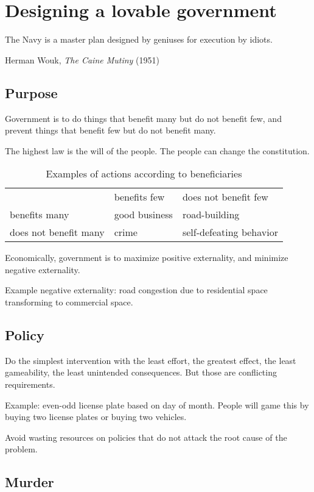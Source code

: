 \chapter{Designing a lovable government}

\epigraph{The Navy is a master plan designed by geniuses for execution by idiots.}{Herman Wouk, \emph{The Caine Mutiny} (1951)}

\section{Purpose}

Government is to do things that benefit many but do not benefit few,
and prevent things that benefit few but do not benefit many.

The highest law is the will of the people.
The people can change the constitution.

\begin{table}[h]
    \caption{Examples of actions according to beneficiaries}
    \begin{tabular}{lll}
        & benefits few & does not benefit few
        \\
        benefits many & good business & road-building
        \\
        does not benefit many & crime & self-defeating behavior
    \end{tabular}
\end{table}

Economically, government is to maximize positive externality,
and minimize negative externality.

Example negative externality:
road congestion due to residential space transforming to commercial space.

\section{Policy}

Do the simplest intervention with the least effort,
the greatest effect, the least gameability,
the least unintended consequences.
But those are conflicting requirements.

Example: even-odd license plate based on day of month.
People will game this by buying two license plates or buying two vehicles.

Avoid wasting resources on policies that
do not attack the root cause of the problem.

\section{Murder}

